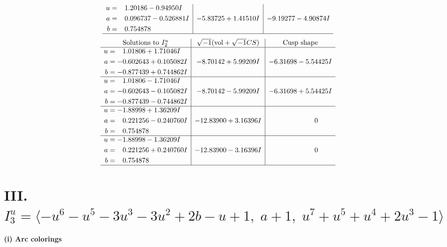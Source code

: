 \documentclass[1p]{elsarticle_modified}
\theoremstyle{definition}
\newcommand{\I}{\sqrt{-1}}
\begin{document}
$$\begin{array}{c|c|c}
\begin{aligned}
u &= \phantom{-}1.20186 - 0.94950 I \\
a &= \phantom{-}0.096737 - 0.526881 I \\
b &= \phantom{-}0.754878\phantom{ +0.000000I}\end{aligned}
 & -5.83725 + 1.41510 I & -9.19277 - 4.90874 I\\
 \hline 
 \end{array}$$\newpage$$\begin{array}{c|c|c}  
\text{Solutions to }I^u_{2}& \I (\text{vol} + \sqrt{-1}CS) & \text{Cusp shape}\\
 \hline 
\begin{aligned}
u &= \phantom{-}1.01806 + 1.71046 I \\
a &= -0.602643 + 0.105082 I \\
b &= -0.877439 + 0.744862 I\end{aligned}
 & -8.70142 + 5.99209 I & -6.31698 - 5.54425 I \\ \hline\begin{aligned}
u &= \phantom{-}1.01806 - 1.71046 I \\
a &= -0.602643 - 0.105082 I \\
b &= -0.877439 - 0.744862 I\end{aligned}
 & -8.70142 - 5.99209 I & -6.31698 + 5.54425 I \\ \hline\begin{aligned}
u &= -1.88998 + 1.36209 I \\
a &= \phantom{-}0.221256 - 0.240760 I \\
b &= \phantom{-}0.754878\phantom{ +0.000000I}\end{aligned}
 & -12.83900 + 3.16396 I & \phantom{-0.000000 } 0 \\ \hline\begin{aligned}
u &= -1.88998 - 1.36209 I \\
a &= \phantom{-}0.221256 + 0.240760 I \\
b &= \phantom{-}0.754878\phantom{ +0.000000I}\end{aligned}
 & -12.83900 - 3.16396 I & \phantom{-0.000000 } 0\\
 \hline 
 \end{array}$$\newpage\newpage\renewcommand{\arraystretch}{1}
\centering \section*{III. $I^u_{3}= \langle - u^6- u^5-3 u^3-3 u^2+2 b- u+1,\;a+1,\;u^7+u^5+u^4+2 u^3-1 \rangle$}
\flushleft \textbf{(i) Arc colorings}\\
\end{document}
